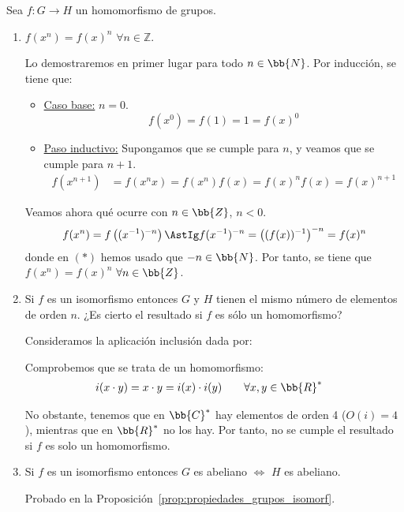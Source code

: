 \begin{ejercicio}\label{ej:2.35}
    Sea $f : G \to H$ un homomorfismo de grupos.
    \begin{enumerate}
        \item $f(x^n) = f(x)^n$ $\forall n \in \mathbb{Z}$.
        
        Lo demostraremos en primer lugar para todo $n\in \bb{N}$. Por inducción, se tiene que:
        \begin{itemize}
            \item \ul{Caso base:} $n=0$.
            \begin{equation*}
                f(x^0)=f(1)=1=f(x)^0
            \end{equation*}

            \item \ul{Paso inductivo:} Supongamos que se cumple para $n$, y veamos que se cumple para $n+1$.
            \begin{align*}
                f(x^{n+1})&=f(x^n x)=f(x^n)f(x)=f(x)^n f(x)=f(x)^{n+1}
            \end{align*}
        \end{itemize}

        Veamos ahora qué ocurre con $n\in \bb{Z}$, $n<0$.
        \begin{equation*}
            f(x^n)=f\left((x^{-1})^{-n}\right)\AstIg f(x^{-1})^{-n} = \left((f(x))^{-1}\right)^{-n} = f(x)^n
        \end{equation*}
        donde en $(\ast)$ hemos usado que $-n\in \bb{N}$.
        Por tanto, se tiene que $f(x^n)=f(x)^n$ $\forall n\in \bb{Z}$.
        \item Si $f$ es un isomorfismo entonces $G$ y $H$ tienen el mismo número de elementos de orden $n$. ¿Es cierto el resultado si $f$ es sólo un homomorfismo?
        
        Consideramos la aplicación inclusión dada por:

        Comprobemos que se trata de un homomorfismo:
        \begin{align*}
            i(x\cdot y)&=x\cdot y=i(x)\cdot i(y)\qquad \forall x,y\in \bb{R}^*
        \end{align*}

        No obstante, tenemos que en $\bb{C}^*$ hay elementos de orden 4 ($O(i)=4$), mientras que en $\bb{R}^*$ no los hay. Por tanto, no se cumple el resultado si $f$ es solo un homomorfismo.
        \item Si $f$ es un isomorfismo entonces $G$ es abeliano $\Leftrightarrow$ $H$ es abeliano.
        
        Probado en la Proposición~\ref{prop:propiedades_grupos_isomorf}.
    \end{enumerate}
\end{ejercicio}

